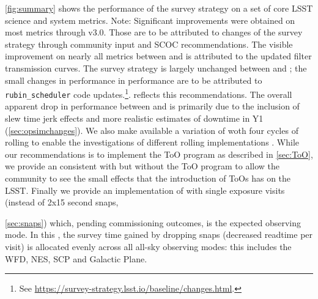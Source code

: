  \autoref{fig:summary} shows the performance of the survey strategy on a set of core LSST science and system metrics. Note: Significant improvements were obtained on most metrics through v3.0. Those are to be attributed to changes of the survey strategy through community input and SCOC recommendations. The visible improvement on nearly all metrics between  and  is attributed to the updated filter transmission curves. The survey strategy is largely unchanged between  and ; the small changes in performance in performance are to be attributed to  \texttt{rubin\_scheduler} code updates.\footnote{See \url{https://survey-strategy.lsst.io/baseline/changes.html}.}.  reflects this recommendations. The overall apparent drop in performance between  and  is primarily due to the inclusion of slew time jerk effects and more realistic estimates of downtime in Y1 (\autoref{sec:opsimchanges}). We also make available a variation of  woth four cycles of rolling to enable the investigations of different rolling implementations . While our recommendations is to implement the ToO program as described in \autoref{sec:ToO}, we provide an \opsim consistent with  but without the ToO program to allow the community to see the small effects that the introduction of ToOs has on the LSST. Finally we provide an implementation of  with single exposure visits (instead of 2x15 second snaps, {\autoref{sec:snaps}) which, pending commissioning outcomes, is the expected observing mode. In this \opsim, the survey time gained by dropping snaps (decreased readtime per visit) is allocated evenly across all all-sky observing modes: this includes the WFD, NES, SCP and Galactic Plane.


}
